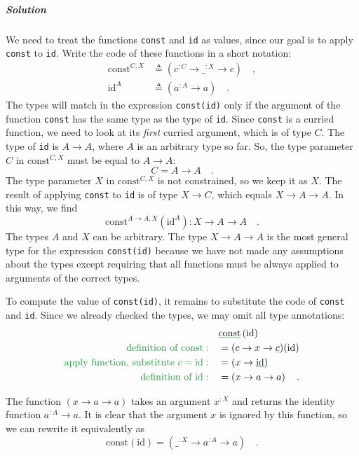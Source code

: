 \subparagraph{Solution}

We need to treat the functions \lstinline!const! and \lstinline!id!
as values, since our goal is to apply \lstinline!const! to \lstinline!id!.
Write the code of these functions in a short notation:
\begin{align*}
\text{const}^{C,X} & \triangleq(c^{:C}\rightarrow\_^{:X}\rightarrow c)\quad,\\
\text{id}^{A} & \triangleq(a^{:A}\rightarrow a)\quad.
\end{align*}
The types will match in the expression \lstinline!const(id)! only
if the argument of the function \lstinline!const! has the same type
as the type of \lstinline!id!. Since \lstinline!const! is a curried
function, we need to look at its \emph{first} curried argument, which
is of type $C$. The type of \lstinline!id! is $A\rightarrow A$,
where $A$ is an arbitrary type so far. So, the type parameter $C$
in $\text{const}^{C,X}$ must be equal to $A\rightarrow A$:
\[
C=A\rightarrow A\quad.
\]
 The type parameter $X$ in $\text{const}^{C,X}$ is not constrained,
so we keep it as $X$. The result of applying \lstinline!const! to
\lstinline!id! is of type $X\rightarrow C$, which equals $X\rightarrow A\rightarrow A$.
In this way, we find 
\[
\text{const}^{A\rightarrow A,X}(\text{id}^{A}):X\rightarrow A\rightarrow A\quad.
\]
The types $A$ and $X$ can be arbitrary. The type $X\rightarrow A\rightarrow A$
is the most general type for the expression \lstinline!const(id)!
because we have not made any assumptions about the types except requiring
that all functions must be always applied to arguments of the correct
types.

To compute the value of \lstinline!const(id)!, it remains to substitute
the code of \lstinline!const! and \lstinline!id!. Since we already
checked the types, we may omit all type annotations:
\begin{align*}
 & \gunderline{\text{const}}\left(\text{id}\right)\\
{\color{greenunder}\text{definition of const}:}\quad & =(c\rightarrow x\rightarrow\gunderline c)(\text{id})\\
{\color{greenunder}\text{apply function, substitute }c=\text{id}:}\quad & =(x\rightarrow\gunderline{\text{id}})\\
{\color{greenunder}\text{definition of }\text{id}:}\quad & =\left(x\rightarrow a\rightarrow a\right)\quad.
\end{align*}

The function $\left(x\rightarrow a\rightarrow a\right)$ takes an
argument $x^{:X}$ and returns the identity function $a^{:A}\rightarrow a$.
It is clear that the argument $x$ is ignored by this function, so
we can rewrite it equivalently as
\[
\text{const}\left(\text{id}\right)=(\_^{:X}\rightarrow a^{:A}\rightarrow a)\quad.
\]


